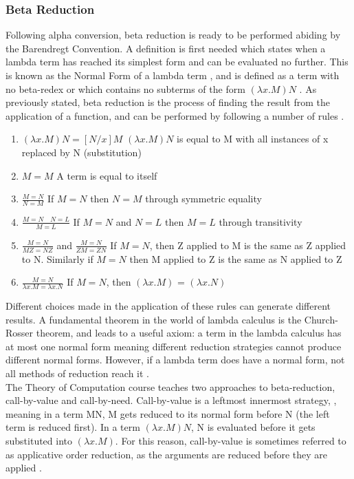\documentclass[a4paper,11pt]{report}
\begin{document}
\subsubsection{Beta Reduction}

Following alpha conversion, beta reduction is ready to be performed abiding by the Barendregt Convention. A definition is first needed which states when a lambda term has reached its simplest form and can be evaluated no further. This is known as the Normal Form of a lambda term \cite{Barendregt2000}, and is defined as a term with no beta-redex \cite{Hudak2008} or which contains no subterms of the form $(\lambda x.M)N$ \cite{Hankin2004}. As previously stated, beta reduction is the process of finding the result from the application of a function, and can be performed by following a number of rules \cite{Gay2019}.

\begin{enumerate}
	\item $(\lambda x.M)N = [N / x]M$
	\subitem $(\lambda x.M)N$ is equal to M with all instances of x replaced by N (substitution)
	\item $M = M$
	\subitem A term is equal to itself
	\item $\frac{M=N}{N=M}$
	\subitem If $M=N$ then $N=M$ through symmetric equality
	\item $\frac{M=N \quad N=L}{M=L}$
	\subitem If $M=N$ and $N=L$ then $M=L$ through transitivity
	\item $\frac{M=N}{MZ=NZ}$ and $\frac{M=N}{ZM=ZN}$
	\subitem If $M=N$, then Z applied to M is the same as Z applied to N. Similarly if $M=N$ then M applied to Z is the same as N applied to Z
	\item $\frac{M=N}{\lambda x.M = \lambda x.N}$
	\subitem If $M=N$, then $(\lambda x.M)$ = $(\lambda x.N)$
\end{enumerate}

Different choices made in the application of these rules can generate different results. A fundamental theorem in the world of lambda calculus is the Church-Rosser theorem, and leads to a useful axiom: a term in the lambda calculus has at most one normal form \cite{Alonzo1936} meaning different reduction strategies cannot produce different normal forms. However, if a lambda term does have a normal form, not all methods of reduction reach it \cite{Horowitz2013}.\\

The Theory of Computation course teaches two approaches to beta-reduction, call-by-value and call-by-need. Call-by-value is a leftmost innermost strategy, \cite{Gay2019}, meaning in a term MN, M gets reduced to its normal form before N (the left term is reduced first). In a term $(\lambda x.M)N$, N is evaluated before it gets substituted into $(\lambda x.M)$. For this reason, call-by-value is sometimes referred to as applicative order reduction, as the arguments are reduced before they are applied \cite{Sookocheff2018Evaluation}.\\
\end{document}
